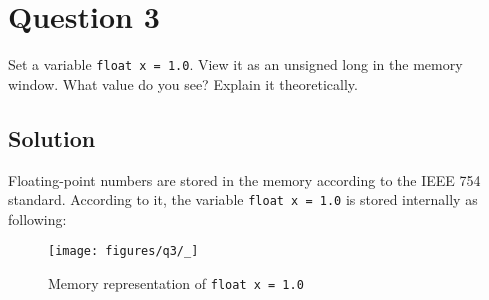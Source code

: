\section*{Question 3}

Set a variable \verb|float x = 1.0|.
View it as an unsigned long in the memory window.
What value do you see?
Explain it theoretically.

\subsection*{Solution}

Floating-point numbers are stored in the memory according to the IEEE 754 standard.
According to it, the variable \texttt{float x = 1.0} is stored internally as following:

\begin{figure*}[htb]
    \centering
    \texttt{[image: figures/q3/\_]}
    \caption{
        Memory representation of \texttt{float x = 1.0}
    }
\end{figure*}
